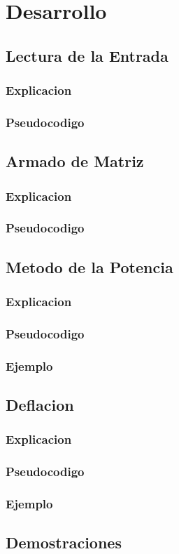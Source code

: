 \section{Desarrollo}
\subsection{Lectura de la Entrada}

\subsubsection{Explicacion}

\subsubsection{Pseudocodigo}

\subsection{Armado de Matriz}

\subsubsection{Explicacion}

\subsubsection{Pseudocodigo}

\subsection{Metodo de la Potencia}

\subsubsection{Explicacion}

\subsubsection{Pseudocodigo}

\subsubsection{Ejemplo}


\subsection{Deflacion}
\subsubsection{Explicacion}
\subsubsection{Pseudocodigo}

\subsubsection{Ejemplo}


\subsection{Demostraciones}

